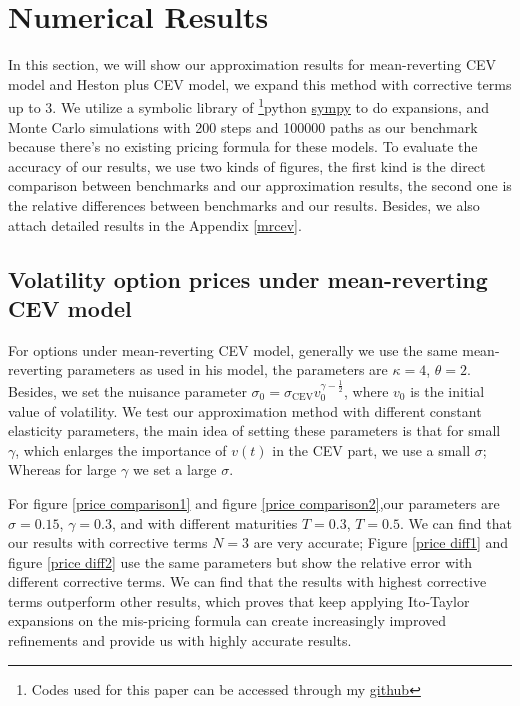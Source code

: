 \chapter{Numerical Results}

In this section, we will show our approximation results for mean-reverting CEV model and Heston plus CEV model, we expand this method with corrective terms up to 3. We utilize a symbolic library of \footnote{Codes used for this paper can be accessed through my \href{https://github.com/ywang408/master-thesis-code}{github}}{python} \href{https://www.sympy.org/en/index.html}{sympy} to do expansions, and Monte Carlo simulations with 200 steps and 100000 paths as our benchmark because there's no existing pricing formula for these models. To evaluate the accuracy of our results, we use two kinds of figures, the first kind is the direct comparison between benchmarks and our approximation results, the second one is the relative differences between benchmarks and our results. Besides, we also attach detailed results in the Appendix \ref{mrcev}.

\section{Volatility option prices under mean-reverting CEV model}

For options under mean-reverting CEV model, generally we use the same mean-reverting parameters as \cite{grunbichler_valuing_1996} used in his model, the parameters are $\kappa=4$, $\theta=2$. Besides, we set the nuisance parameter $\sigma_0 = \sigma_{\text{CEV}} v_0^{\gamma-\frac{1}{2}}$, where $v_0$ is the initial value of volatility. We test our approximation method with different constant elasticity parameters, the main idea of setting these parameters is that for small $\gamma$, which enlarges the importance of $v(t)$ in the CEV part, we use a small $\sigma$; Whereas for large $\gamma$ we set a large $\sigma$. 

For figure \ref{price comparison1} and figure \ref{price comparison2},our parameters are $\sigma=0.15$, $\gamma=0.3$, and with different maturities $T=0.3$, $T=0.5$. We can find that our results with corrective terms $N=3$ are very accurate; Figure \ref{price diff1} and figure \ref{price diff2} use the same parameters but show the relative error with different corrective terms. We can find that the results with highest corrective terms outperform other results, which proves that keep applying Ito-Taylor expansions on the mis-pricing formula can create increasingly improved refinements and provide us with highly accurate results.

